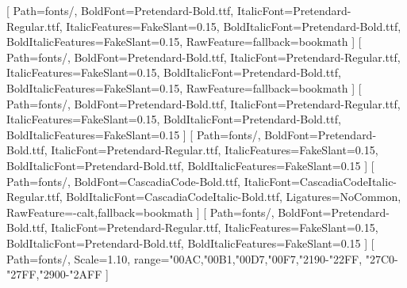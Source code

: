 \usepackage{luatexko}
\usepackage{unicode-math}
\usepackage{etoolbox}
\usepackage[a4paper,margin=24mm,headheight=16pt]{geometry}


\setmainfont{Pretendard-Regular.ttf}[
  Path=fonts/,
  BoldFont=Pretendard-Bold.ttf,
  ItalicFont=Pretendard-Regular.ttf,
  ItalicFeatures={FakeSlant=0.15},
  BoldItalicFont=Pretendard-Bold.ttf,
  BoldItalicFeatures={FakeSlant=0.15},
  RawFeature={fallback=bookmath}
]
\setsansfont{Pretendard-Regular.ttf}[
  Path=fonts/,
  BoldFont=Pretendard-Bold.ttf,
  ItalicFont=Pretendard-Regular.ttf,
  ItalicFeatures={FakeSlant=0.15},
  BoldItalicFont=Pretendard-Bold.ttf,
  BoldItalicFeatures={FakeSlant=0.15},
  RawFeature={fallback=bookmath}
]
[
  Path=fonts/,
  BoldFont=Pretendard-Bold.ttf,
  ItalicFont=Pretendard-Regular.ttf,
  ItalicFeatures={FakeSlant=0.15},
  BoldItalicFont=Pretendard-Bold.ttf,
  BoldItalicFeatures={FakeSlant=0.15}
]
[
  Path=fonts/,
  BoldFont=Pretendard-Bold.ttf,
  ItalicFont=Pretendard-Regular.ttf,
  ItalicFeatures={FakeSlant=0.15},
  BoldItalicFont=Pretendard-Bold.ttf,
  BoldItalicFeatures={FakeSlant=0.15}
]
\setmonofont{CascadiaCode-Regular.ttf}[
  Path=fonts/,
  BoldFont=CascadiaCode-Bold.ttf,
  ItalicFont=CascadiaCodeItalic-Regular.ttf,
  BoldItalicFont=CascadiaCodeItalic-Bold.ttf,
  Ligatures=NoCommon,
  RawFeature={-calt,fallback=bookmath}
]
[
  Path=fonts/,
  BoldFont=Pretendard-Bold.ttf,
  ItalicFont=Pretendard-Regular.ttf,
  ItalicFeatures={FakeSlant=0.15},
  BoldItalicFont=Pretendard-Bold.ttf,
  BoldItalicFeatures={FakeSlant=0.15}
]
[
  Path=fonts/,
  Scale=1.10,
  range={"00AC,"00B1,"00D7,"00F7,"2190-"22FF,
    "27C0-"27FF,"2900-"2AFF}
]


